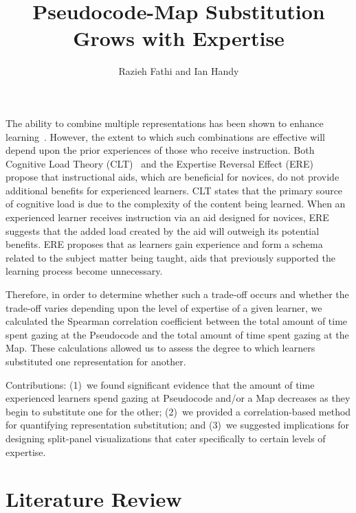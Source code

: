 \documentclass[journal]{vgtc}
\title{Pseudocode-Map Substitution Grows with Expertise}
\author{%
  Razieh Fathi and Ian Handy
}
\begin{document}

\maketitle

The ability to combine multiple representations has been shown to
enhance learning~\cite{Mayer2001Multimedia}. However, the extent to
which such combinations are effective will depend upon the prior
experiences of those who receive instruction. Both Cognitive Load
Theory (CLT)~\cite{Sweller1988Cognitive} and the Expertise Reversal
Effect (ERE)~\cite{Kalyuga2003Expertise} propose that instructional
aids, which are beneficial for novices, do not provide additional
benefits for experienced learners. CLT states that the primary source
of cognitive load is due to the complexity of the content being
learned. When an experienced learner receives instruction via an aid
designed for novices, ERE suggests that the added load created by the
aid will outweigh its potential benefits. ERE proposes that as
learners gain experience and form a schema related to the subject
matter being taught, aids that previously supported the learning
process become unnecessary.

Therefore, in order to determine whether such a trade-off occurs and
whether the trade-off varies depending upon the level of expertise of
a given learner, we calculated the Spearman correlation coefficient
between the total amount of time spent gazing at the Pseudocode and
the total amount of time spent gazing at the Map. These calculations
allowed us to assess the degree to which learners substituted one
representation for another.

Contributions: (1)~we found significant evidence that the amount of
time experienced learners spend gazing at Pseudocode and/or a Map
decreases as they begin to substitute one for the other; (2)~we
provided a correlation-based method for quantifying representation
substitution; and (3)~we suggested implications for designing
split-panel visualizations that cater specifically to certain levels
of expertise.


\section{Literature Review}
\end{document}
